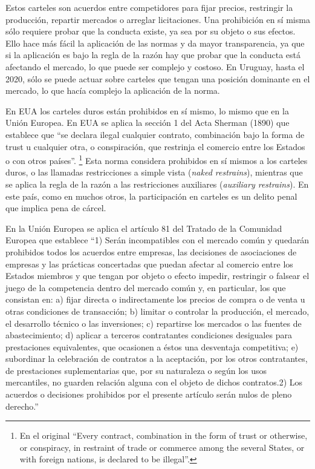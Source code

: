 \documentclass[
  12pt,
  spanish,
]{book}
\begin{document}
Estos carteles son acuerdos entre competidores para fijar precios,
restringir la producción, repartir mercados o arreglar licitaciones. Una
prohibición en sí misma sólo requiere probar que la conducta existe, ya
sea por su objeto o sus efectos. Ello hace más fácil la aplicación de
las normas y da mayor transparencia, ya que si la aplicación es bajo la
regla de la razón hay que probar que la conducta está afectando el
mercado, lo que puede ser complejo y costoso. En Uruguay, hasta el 2020,
sólo se puede actuar sobre carteles que tengan una posición dominante en
el mercado, lo que hacía complejo la aplicación de la norma.

En EUA los carteles duros están prohibidos en sí mismo, lo mismo que en
la Unión Europea. En EUA se aplica la sección 1 del Acta Sherman (1890)
que establece que ``se declara ilegal cualquier contrato, combinación
bajo la forma de trust u cualquier otra, o conspiración, que restrinja
el comercio entre los Estados o con otros países''. \footnote{En el
  original ``Every contract, combination in the form of trust or
  otherwise, or conspiracy, in restraint of trade or commerce among the
  several States, or with foreign nations, is declared to be illegal''.}
Esta norma considera prohibidos en sí mismos a los carteles duros, o las
llamadas restricciones a simple vista (\emph{naked restrains}), mientras
que se aplica la regla de la razón a las restricciones auxiliares
(\emph{auxiliary restrains}). En este país, como en muchos otros, la
participación en carteles es un delito penal que implica pena de cárcel.

En la Unión Europea se aplica el artículo 81 del Tratado de la Comunidad
Europea que establece ``1) Serán incompatibles con el mercado común y
quedarán prohibidos todos los acuerdos entre empresas, las decisiones de
asociaciones de empresas y las prácticas concertadas que puedan afectar
al comercio entre los Estados miembros y que tengan por objeto o efecto
impedir, restringir o falsear el juego de la competencia dentro del
mercado común y, en particular, los que consistan en: a) fijar directa o
indirectamente los precios de compra o de venta u otras condiciones de
transacción; b) limitar o controlar la producción, el mercado, el
desarrollo técnico o las inversiones; c) repartirse los mercados o las
fuentes de abastecimiento; d) aplicar a terceros contratantes
condiciones desiguales para prestaciones equivalentes, que ocasionen a
éstos una desventaja competitiva; e) subordinar la celebración de
contratos a la aceptación, por los otros contratantes, de prestaciones
suplementarias que, por su naturaleza o según los usos mercantiles, no
guarden relación alguna con el objeto de dichos contratos.2) Los
acuerdos o decisiones prohibidos por el presente artículo serán nulos de
pleno derecho.''
\end{document}
